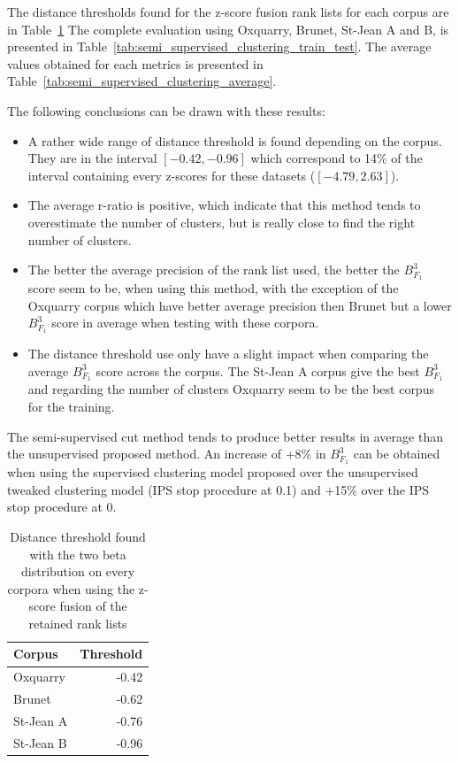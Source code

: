 The distance thresholds found for the z-score fusion rank lists for each corpus are in Table~\ref{tab:semi_supervised_clustering_thresholds}
The complete evaluation using Oxquarry, Brunet, St-Jean A and B, is presented in Table~\ref{tab:semi_supervised_clustering_train_test}.
The average values obtained for each metrics is presented in Table~\ref{tab:semi_supervised_clustering_average}.

The following conclusions can be drawn with these results:
\begin{itemize}
  \item
  A rather wide range of distance threshold is found depending on the corpus. They are in the interval $\left[-0.42, -0.96\right]$ which correspond to 14\% of the interval containing every z-scores for these datasets ($\left[-4.79, 2.63\right]$).
  \item
  The average r-ratio is positive, which indicate that this method tends to overestimate the number of clusters, but is really close to find the right number of clusters.
  \item
  The better the average precision of the rank list used, the better the $B^3_{F_1}$ score seem to be, when using this method, with the exception of the Oxquarry corpus which have better average precision then Brunet but a lower $B^3_{F_1}$ score in average when testing with these corpora.
  \item
  The distance threshold use only have a slight impact when comparing the average $B^3_{F_1}$ score across the corpus.
  The St-Jean A corpus give the best $B^3_{F_1}$ and regarding the number of clusters Oxquarry seem to be the best corpus for the training.
\end{itemize}

The semi-supervised cut method tends to produce better results in average than the unsupervised proposed method.
An increase of +8\% in $B^3_{F_1}$ can be obtained when using the supervised clustering model proposed over the unsupervised tweaked clustering model (IPS stop procedure at 0.1) and +15\% over the IPS stop procedure at 0.

\begin{table}
  \centering
  \caption{Distance threshold found with the two beta distribution on every corpora when using the z-score fusion of the retained rank lists}
  \label{tab:semi_supervised_clustering_thresholds}

  \begin{tabular}{l r}
    \toprule
    Corpus & Threshold \\
    \midrule
    Oxquarry & -0.42 \\
    Brunet & -0.62 \\
    St-Jean A & -0.76 \\
    St-Jean B & -0.96 \\
    \bottomrule
  \end{tabular}
\end{table}

